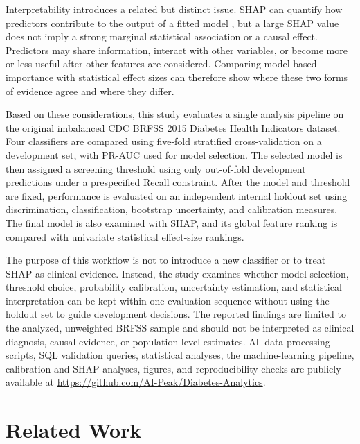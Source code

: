 \documentclass[pdflatex,sn-basic,Numbered]{sn-jnl}
\begin{document}
Interpretability introduces a related but distinct issue.
SHAP can quantify how predictors contribute to the output of a fitted
model
\citep{lundberg2017unified,lundberg2020trees}, but a large SHAP value does
not imply a strong marginal statistical association or a causal effect.
Predictors may share information, interact with other variables, or become
more or less useful after other features are considered.
Comparing model-based importance with statistical effect sizes can therefore
show where these two forms of evidence agree and where they differ.

Based on these considerations, this study evaluates a single analysis
pipeline on the original imbalanced CDC BRFSS 2015 Diabetes Health
Indicators dataset.
Four classifiers are compared using five-fold stratified cross-validation
on a development set, with PR-AUC used for model selection.
The selected model is then assigned a screening threshold using only
out-of-fold development predictions under a prespecified Recall constraint.
After the model and threshold are fixed, performance is evaluated on an
independent internal holdout set using discrimination, classification,
bootstrap uncertainty, and calibration measures.
The final model is also examined with SHAP, and its global feature ranking
is compared with univariate statistical effect-size rankings.

The purpose of this workflow is not to introduce a new classifier or to
treat SHAP as clinical evidence.
Instead, the study examines whether model selection, threshold choice,
probability calibration, uncertainty estimation, and statistical
interpretation can be kept within one evaluation sequence without using the
holdout set to guide development decisions.
The reported findings are limited to the analyzed, unweighted BRFSS sample
and should not be interpreted as clinical diagnosis, causal evidence, or
population-level estimates.
All data-processing scripts, SQL validation queries, statistical analyses,
the machine-learning pipeline, calibration and SHAP analyses, figures, and
reproducibility checks are publicly available at
\url{https://github.com/AI-Peak/Diabetes-Analytics}.

\section{Related Work}
\label{sec:related}
\end{document}
